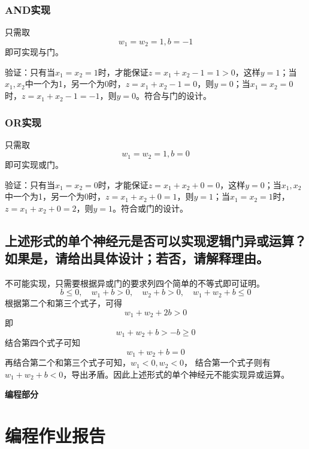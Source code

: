 \documentclass[a4paper]{article}
\begin{document}
\subsubsection{AND实现}

只需取\[ w_1 = w_2 = 1, b = -1\]即可实现与门。\par
验证：只有当$x_1 = x_2 = 1$时，才能保证$z = x_1 + x_2 -1 = 1 > 0$，这样$y = 1$；当$x_1,x_2$中一个为1，另一个为0时，$z = x_1 + x_2 -1 = 0$，则$y = 0$；当$x_1=x_2=0$时，$z = x_1 + x_2 -1 = -1$，则$y = 0$。符合与门的设计。
\subsubsection{OR实现}
只需取\[ w_1 = w_2 = 1, b = 0\]即可实现或门。\par
验证：只有当$x_1 = x_2 = 0$时，才能保证$z = x_1 + x_2 +0 = 0$，这样$y = 0$；当$x_1,x_2$中一个为1，另一个为0时，$z = x_1 + x_2 + 0 = 1$，则$y = 1$；当$x_1=x_2=1$时，$z = x_1 + x_2 + 0 = 2$，则$y = 1$。符合或门的设计。
\subsection{上述形式的单个神经元是否可以实现逻辑门异或运算？如果是，请给出具体设计；若否，请解释理由。}
不可能实现，只需要根据异或门的要求列四个简单的不等式即可证明。
\[
b \leq 0,\quad
w_1 + b > 0,\quad
w_2 + b > 0,\quad
w_1 + w_2 + b \leq 0
\]
根据第二个和第三个式子，可得$$w_1 + w_2 + 2b > 0$$即\[ w_1 + w_2 + b > -b \geq  0 \]结合第四个式子可知\[ w_1 + w_2 + b  =  0 \]
再结合第二个和第三个式子可知，$w_1 < 0, w_2<0$，
结合第一个式子则有$w_1+w_2+b<0$，导出矛盾。因此上述形式的单个神经元不能实现异或运算。
\vspace{6mm}
\centerline{\textbf{\Large{编程部分}}}
\vspace{3mm}
\section{编程作业报告}
\end{document}

